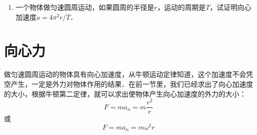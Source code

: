 \begin{enumerate}
    \item 一个物体做匀速圆周运动，如果圆周的半径是$r$，运动的周期是$T$，试证明向心加速度$a=4\pi^2r/T$．
\end{enumerate}
\newpage
\section{向心力}
做匀速圆周运动的物体具有向心加速度，从牛顿运动定律知道，这个加速度不会凭空产生，一定是外力对物体作用的结果．在前一节里，我们已经求出了向心加速度的大小，根据牛顿第二定律，就可以求出使物体产生向心加速度的外力的大小：
\begin{equation}
    F=ma_n=m\frac{v^2}{r}
\end{equation}
或
\begin{equation}
    F=ma_n=m\omega^2 r
\end{equation}

